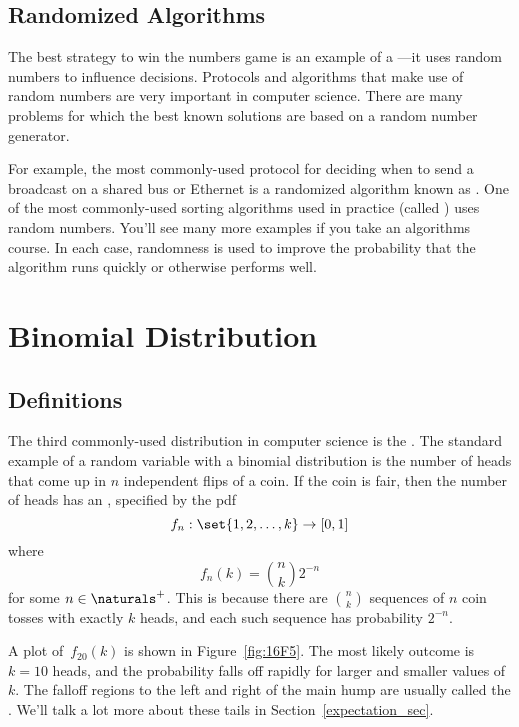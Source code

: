 \subsection{Randomized Algorithms}

The best strategy to win the numbers game is an example of a
---it uses random numbers to influence
decisions.  Protocols and algorithms that make use of random numbers
are very important in computer science.  There are many problems for
which the best known solutions are based on a random number generator.

For example, the most commonly-used protocol for deciding when to send
a broadcast on a shared bus or Ethernet is a randomized algorithm
known as .  One of the most commonly-used
sorting algorithms used in practice (called ) uses
random numbers.  You'll see many more examples if you take an
algorithms course.  In each case, randomness is used to improve the
probability that the algorithm runs quickly or otherwise performs
well.

\section{Binomial Distribution}\label{binomial_distribution_section}

\subsection{Definitions}

The third commonly-used distribution in computer science is the
.  The standard example of a random
variable with a binomial distribution is the number of heads that come
up in $n$ independent flips of a coin.  If the coin is fair, then the
number of heads has an ,
specified by the pdf
\begin{equation*}
    f_n: \set{1, 2, \dots, k} \to [0, 1]
\end{equation*}
where
\begin{equation*}
    f_n(k) = \binom{n}{k} 2^{-n}
\end{equation*}
for some $n \in \naturals^+$.  This is because there are
$\binom{n}{k}$ sequences of $n$ coin tosses with exactly $k$ heads,
and each such sequence has probability $2^{-n}$.

A plot of~$f_{20}(k)$ is shown in Figure~\ref{fig:16F5}.  The most
likely outcome is $k = 10$ heads, and the probability falls off
rapidly for larger and smaller values of $k$.  The falloff regions to
the left and right of the main hump are usually called the .  We'll talk a lot more about these tails in
Section~\ref{expectation_sec}.

